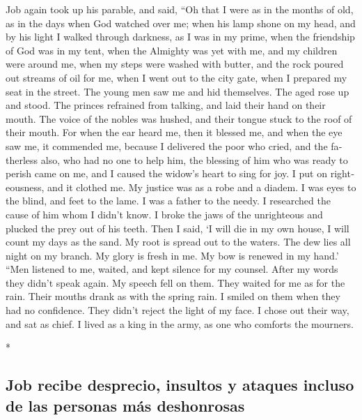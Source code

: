 \begin{paracol}{2}
\begin{otherlanguage}{english}
 Job again took up his parable, and said, 
``Oh that I were as in the months of old, as in the days when God
watched over me;  when his lamp shone on my head, and by
his light I walked through darkness,  as I was in my
prime, when the friendship of God was in my tent,  when
the Almighty was yet with me, and my children were around me,
 when my steps were washed with butter, and the rock
poured out streams of oil for me,  when I went out to the
city gate, when I prepared my seat in the street.  The
young men saw me and hid themselves. The aged rose up and stood.
 The princes refrained from talking, and laid their hand
on their mouth.  The voice of the nobles was hushed, and
their tongue stuck to the roof of their mouth.  For when
the ear heard me, then it blessed me, and when the eye saw me, it
commended me,  because I delivered the poor who cried,
and the fatherless also, who had no one to help him,  the
blessing of him who was ready to perish came on me, and I caused the
widow's heart to sing for joy.  I put on righteousness,
and it clothed me. My justice was as a robe and a diadem.
 I was eyes to the blind, and feet to the lame.
 I was a father to the needy. I researched the cause of
him whom I didn't know.  I broke the jaws of the
unrighteous and plucked the prey out of his teeth.  Then
I said, `I will die in my own house, I will count my days as the sand.
 My root is spread out to the waters. The dew lies all
night on my branch.  My glory is fresh in me. My bow is
renewed in my hand.'  ``Men listened to me, waited, and
kept silence for my counsel.  After my words they didn't
speak again. My speech fell on them.  They waited for me
as for the rain. Their mouths drank as with the spring rain.
 I smiled on them when they had no confidence. They
didn't reject the light of my face.  I chose out their
way, and sat as chief. I lived as a king in the army, as one who
comforts the mourners.

\end{otherlanguage}

\switchcolumn[0]*

\hypertarget{job-recibe-desprecio-insultos-y-ataques-incluso-de-las-personas-muxe1s-deshonrosas}{%
\subsection{Job recibe desprecio, insultos y ataques incluso de las
personas más
deshonrosas}\label{job-recibe-desprecio-insultos-y-ataques-incluso-de-las-personas-muxe1s-deshonrosas}}


\end{paracol}
